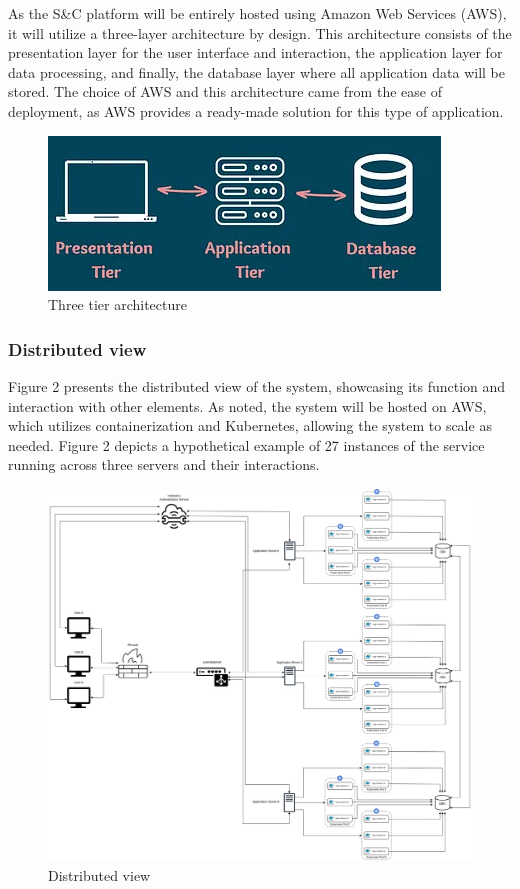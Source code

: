 As the S\&C platform will be entirely hosted using Amazon Web Services (AWS), it will utilize a three-layer architecture by design. This architecture consists of the presentation layer for the user interface and interaction, the application layer for data processing, and finally, the database layer where all application data will be stored. The choice of AWS and this architecture came from the ease of deployment, as AWS provides a ready-made solution for this type of application.

\begin{figure}[h]
    \centering
    \includegraphics[width=1\linewidth]{DD-Latex//assets/Three tier.jpg}
    \caption{Three tier architecture \cite{MToC_2023}}
    \label{fig:enter-label}
\end{figure}

\subsubsection{Distributed view} 
Figure 2 presents the distributed view of the system, showcasing its function and interaction with other elements. As noted, the system will be hosted on AWS, which utilizes containerization and Kubernetes, allowing the system to scale as needed. Figure 2 depicts a hypothetical example of 27 instances of the service running across three servers and their interactions.
\newpage
\begin{figure}[h]
    \centering
    \includegraphics[width=1\linewidth]{DD-Latex//assets//Distributed View/Distributed View.jpg}
    \caption{Distributed view}
    \label{fig:enter-label}
\end{figure}

